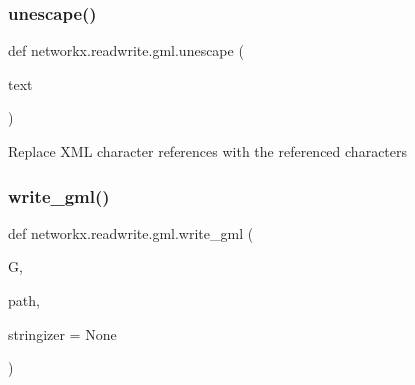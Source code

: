 \subsubsection{\texorpdfstring{unescape()}{unescape()}}
{\footnotesize\ttfamily def networkx.\+readwrite.\+gml.\+unescape (\begin{DoxyParamCaption}\item[{}]{text }\end{DoxyParamCaption})}

\begin{DoxyVerb}Replace XML character references with the referenced characters\end{DoxyVerb}
 \mbox{\label{namespacenetworkx_1_1readwrite_1_1gml_ad43015e77f44b01748f1943fadda2c3e}} 
\subsubsection{\texorpdfstring{write\+\_\+gml()}{write\_gml()}}
{\footnotesize\ttfamily def networkx.\+readwrite.\+gml.\+write\+\_\+gml (\begin{DoxyParamCaption}\item[{}]{G,  }\item[{}]{path,  }\item[{}]{stringizer = {\ttfamily None} }\end{DoxyParamCaption})}


